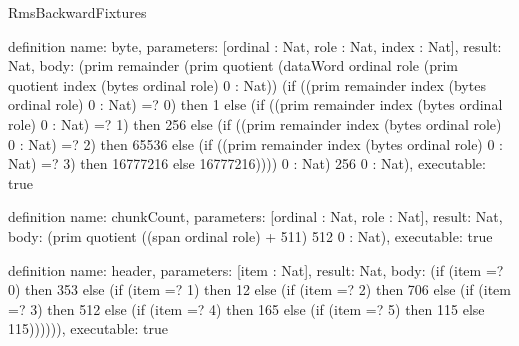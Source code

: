 \begin{lexlean}{RmsBackwardFixtures}
\begin{semanticmodule}
definition{
  name: byte,
  parameters: [ordinal : Nat, role : Nat, index : Nat],
  result: Nat,
  body: (prim remainder (prim quotient (dataWord ordinal role (prim quotient index (bytes ordinal role) 0 : Nat)) (if ((prim remainder index (bytes ordinal role) 0 : Nat) =? 0) then 1 else (if ((prim remainder index (bytes ordinal role) 0 : Nat) =? 1) then 256 else (if ((prim remainder index (bytes ordinal role) 0 : Nat) =? 2) then 65536 else (if ((prim remainder index (bytes ordinal role) 0 : Nat) =? 3) then 16777216 else 16777216)))) 0 : Nat) 256 0 : Nat),
  executable: true
}

definition{
  name: chunkCount,
  parameters: [ordinal : Nat, role : Nat],
  result: Nat,
  body: (prim quotient ((span ordinal role) + 511) 512 0 : Nat),
  executable: true
}

definition{
  name: header,
  parameters: [item : Nat],
  result: Nat,
  body: (if (item =? 0) then 353 else (if (item =? 1) then 12 else (if (item =? 2) then 706 else (if (item =? 3) then 512 else (if (item =? 4) then 165 else (if (item =? 5) then 115 else 115)))))),
  executable: true
}


\end{semanticmodule}
\end{lexlean}
